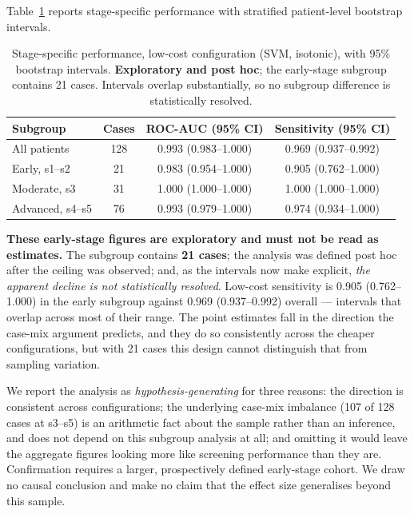\documentclass[conference]{IEEEtran}
\newcommand{\tabhead}[1]{\textbf{#1}}
\begin{document}
Table~\ref{tab:subgroup} reports stage-specific performance with stratified
patient-level bootstrap intervals.

\begin{table}[t]
\caption{Stage-specific performance, low-cost configuration (SVM, isotonic),
with 95\% bootstrap intervals. \textbf{Exploratory and post hoc}; the
early-stage subgroup contains 21 cases. Intervals overlap substantially, so
no subgroup difference is statistically resolved.}
\label{tab:subgroup}
\centering
\footnotesize
\setlength{\tabcolsep}{3pt}
\begin{tabular}{lccc}
\toprule
\tabhead{Subgroup} & \tabhead{Cases} & \tabhead{ROC-AUC (95\% CI)} &
\tabhead{Sensitivity (95\% CI)} \\
\midrule
All patients      & 128 & 0.993 (0.983--1.000) & 0.969 (0.937--0.992) \\
Early, s1--s2     &  21 & 0.983 (0.954--1.000) & 0.905 (0.762--1.000) \\
Moderate, s3      &  31 & 1.000 (1.000--1.000) & 1.000 (1.000--1.000) \\
Advanced, s4--s5  &  76 & 0.993 (0.979--1.000) & 0.974 (0.934--1.000) \\
\bottomrule
\end{tabular}
\end{table}

\textbf{These early-stage figures are exploratory and must not be read as
estimates.} The subgroup contains \textbf{21 cases}; the analysis was defined
post hoc after the ceiling was observed; and, as the intervals now make
explicit, \emph{the apparent decline is not statistically resolved}. Low-cost
sensitivity is 0.905 (0.762--1.000) in the early subgroup against 0.969
(0.937--0.992) overall --- intervals that overlap across most of their range.
The point estimates fall in the direction the case-mix argument predicts, and
they do so consistently across the cheaper configurations, but with 21 cases
this design cannot distinguish that from sampling variation.

We report the analysis as \emph{hypothesis-generating} for three reasons: the
direction is consistent across configurations; the underlying case-mix
imbalance (107 of 128 cases at s3--s5) is an arithmetic fact about the sample
rather than an inference, and does not depend on this subgroup analysis at
all; and omitting it would leave the aggregate figures looking more like
screening performance than they are. Confirmation requires a larger,
prospectively defined early-stage cohort. We draw no causal conclusion and
make no claim that the effect size generalises beyond this sample.
\end{document}
